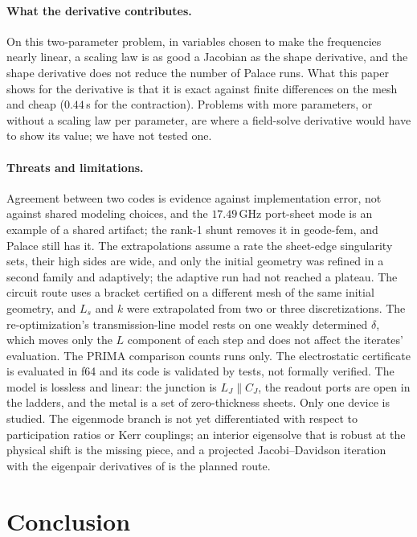 \documentclass{anvil-paper}
\begin{document}
\paragraph{What the derivative contributes.}
On this two-parameter problem, in variables chosen to make the frequencies
nearly linear, a scaling law is as good a Jacobian as the shape derivative,
and the shape derivative does not reduce the number of Palace runs. What
this paper shows for the derivative is that it is exact against finite
differences on the mesh and cheap ($0.44$\,s for the contraction). Problems
with more parameters, or without a scaling law per parameter, are where a
field-solve derivative would have to show its value; we have not tested
one.

\paragraph{Threats and limitations.}
Agreement between two codes is evidence against implementation error, not
against shared modeling choices, and the $17.49$\,GHz port-sheet mode is an
example of a shared artifact; the rank-1 shunt removes it in geode-fem, and
Palace still has it. The extrapolations assume a rate the sheet-edge
singularity sets, their high sides are wide, and only the initial geometry
was refined in a second family and adaptively; the adaptive run had not
reached a plateau. The circuit route uses a bracket certified on a
different mesh of the same initial geometry, and $L_s$ and $k$ were
extrapolated from two or three discretizations. The re-optimization's
transmission-line model rests on one weakly determined $\delta$, which
moves only the $L$ component of each step and does not affect the
iterates' evaluation. The PRIMA comparison counts runs only. The
electrostatic certificate is evaluated in f64 and its code is validated
by tests, not formally verified. The model is lossless and linear: the
junction is $L_J \parallel C_J$, the readout ports are open in the ladders,
and the metal is a set of zero-thickness sheets. Only one device is
studied. The eigenmode branch is not yet differentiated with respect to
participation ratios or Kerr couplings; an interior eigensolve that is
robust at the physical shift is the missing piece, and a projected
Jacobi--Davidson iteration \citep{liang2026adaptive} with the eigenpair
derivatives of \citet{nelson1976simplified} is the planned route.

\section{Conclusion}
\label{sec:conclusion}
\end{document}
